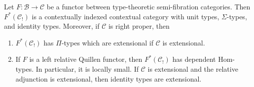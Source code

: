 \documentclass[reqno]{amsart}
\theoremstyle{definition}
\theoremstyle{remark}
\newcommand{\fs}[1]{\mathrm{#1}}
\newcommand{\scat}[1]{\mathcal{#1}}
\newcommand{\Hom}{\fs{Hom}}
\numberwithin{figure}{section}
\begin{document}
\begin{prop}
Let $F : \scat{B} \to \scat{C}$ be a functor between type-theoretic semi-fibration categories.
Then $F^*(\scat{C}_!)$ is a contextually indexed contextual category with unit types, $\Sigma$-types, and identity types.
Moreover, if $\scat{C}$ is right proper, then
\begin{enumerate}
\item $F^*(\scat{C}_!)$ has $\Pi$-types which are extensional if $\scat{C}$ is extensional.
\item If $F$ is a left relative Quillen functor, then $F^*(\scat{C}_!)$ has dependent $\Hom$-types.
In particular, it is locally small.
If $\scat{C}$ is extensional and the relative adjunction is extensional, then identity types are extensional.
\end{enumerate}
\end{prop}
\end{document}
